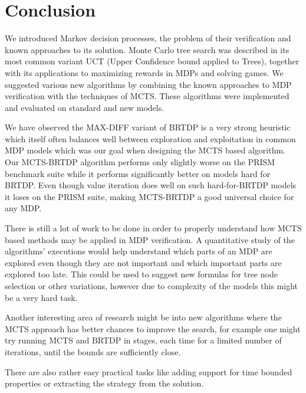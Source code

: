 \chapter{Conclusion}

We introduced Markov decision processes,
the problem of their verification and known approaches to its solution.
Monte Carlo tree search was described in its most common variant UCT
(Upper Confidence bound applied to Trees),
together with its applications to maximizing rewards in MDPs and solving
games.
We suggested various new algorithms by combining the known
approaches to MDP verification with the techniques of MCTS. These
algorithms were implemented and evaluated on standard and new models.

We have observed the MAX-DIFF variant of BRTDP is a very strong
heuristic which itself often balances well between exploration and
exploitation in common MDP models which was our goal when designing the
MCTS based algorithm. Our MCTS-BRTDP algorithm
performs only slightly worse on the PRISM benchmark suite while it
performs significantly better on models hard for BRTDP. Even though
value iteration does well on such hard-for-BRTDP models it loses on the
PRISM suite, making MCTS-BRTDP a good universal choice for any MDP.

There is still a lot of work to be done in order to properly understand
how MCTS based methods may be applied in MDP verification. A
quantitative study of the algorithms' executions would help understand
which parts
of an MDP are explored even though they are not important and which
important parts are explored too late. This could be used to suggest new
formulas for tree node selection or other variations, however due to
complexity of the models this might be a very hard task.

Another interesting area of research might be into
new algorithms where the MCTS approach has better chances to
improve the search, for example one might try running MCTS and BRTDP in
stages, each time for a limited number of iterations, until the bounds
are sufficiently close.

There
are also rather easy practical tasks like adding support for time
bounded properties or extracting the strategy from the
solution.

